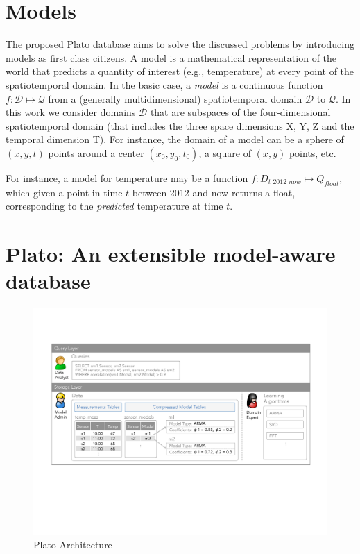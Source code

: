 
\section{Models}
\label{sec:models}

The proposed Plato database aims to solve the discussed problems by introducing models as first class citizens. A model is a mathematical representation of the world that predicts a quantity of interest (e.g., temperature) at every point of the spatiotemporal domain.
In the basic case, a {\em model} is a continuous function $f:\mathcal{D}\mapsto \mathcal{Q}$ from a (generally multidimensional) spatiotemporal domain $\mathcal{D}$ to $\mathcal{Q}$. In this work we consider domains $\mathcal{D}$ that are subspaces of the four-dimensional spatiotemporal domain (that includes the three space dimensions X, Y, Z and the temporal dimension T). For instance, the domain of a model can be a sphere of $(x, y, t)$ points around a center $(x_0, y_0, t_0)$, a square of $(x, y)$ points, etc.

\vspace*{0.5cm}
\begin{example}
For instance, a model for temperature may be a function $f:D_{t\_2012\_now}\mapsto Q_{float}$, which given a point in time $t$ between 2012 and now returns a float, corresponding to the \emph{predicted} temperature at time $t$.
\end{example}
\vspace*{0.5cm}

\section{Plato: An extensible model-aware database}
\label{sec:architecture}

\begin{figure}
\center
\includegraphics[width=\textwidth]{fig-architecture.pdf}
\caption{Plato Architecture}
\label{fig:basic-architecture}
\vspace*{-0.5cm}
\end{figure}

